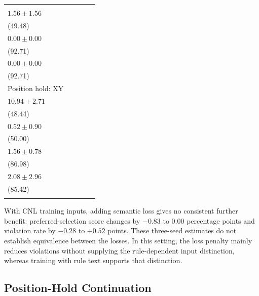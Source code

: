 \begin{table}[tbp]
\begin{tabularx}{\textwidth}{@{}>{\raggedright\arraybackslash}Xcccc@{}}
\begin{tabular}[t]{@{}c@{}}$74.48\pm0.90$\\$1.56\pm1.56$\\(49.48)\end{tabular} &
\begin{tabular}[t]{@{}c@{}}$96.09\pm1.35$\\$0.00\pm0.00$\\(92.71)\end{tabular} &
\begin{tabular}[t]{@{}c@{}}$96.09\pm2.34$\\$0.00\pm0.00$\\(92.71)\end{tabular}\\[5pt]
Position hold: XY & \begin{tabular}[t]{@{}c@{}}$72.66\pm1.35$\\$10.94\pm2.71$\\(48.44)\end{tabular} &
\begin{tabular}[t]{@{}c@{}}$74.74\pm0.45$\\$0.52\pm0.90$\\(50.00)\end{tabular} &
\begin{tabular}[t]{@{}c@{}}$93.49\pm1.19$\\$1.56\pm0.78$\\(86.98)\end{tabular} &
\begin{tabular}[t]{@{}c@{}}$92.71\pm3.61$\\$2.08\pm2.96$\\(85.42)\end{tabular}\\
\botrule
\end{tabularx}
\end{table}

With CNL training inputs, adding semantic loss gives no consistent further
benefit: preferred-selection score changes by $-0.83$ to $0.00$ percentage points and violation
rate by $-0.28$ to $+0.52$ points. These three-seed estimates do not establish
equivalence between the losses. In this setting, the loss penalty mainly
reduces violations without supplying the rule-dependent input distinction,
whereas training with rule text supports that distinction.

\subsection{Position-Hold Continuation}\label{sec:results-continuation}

